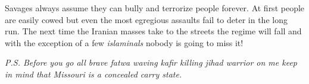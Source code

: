 Savages always assume they can bully and terrorize people forever. At
first people are easily cowed but even the most egregious assaults fail
to deter in the long run. The next time the Iranian masses take to the
streets the regime will fall and with the exception of a few
\emph{islaminals} nobody is going to miss it!

\emph{P.S. Before you go all brave fatwa waving kafir killing jihad
warrior on me keep in mind that Missouri is a concealed carry state.}




%